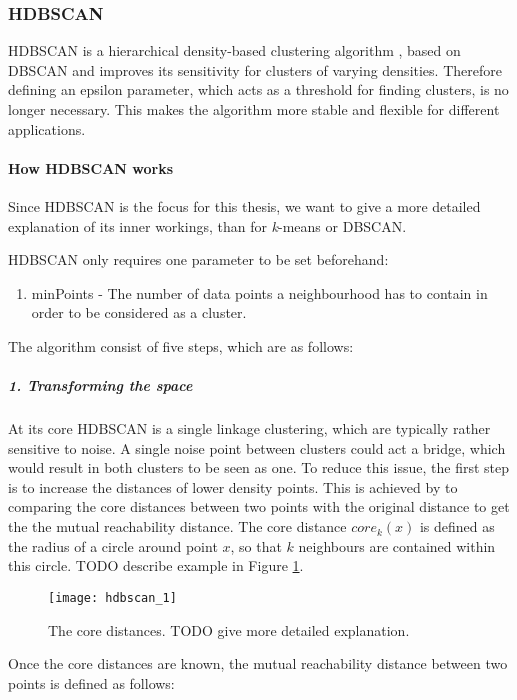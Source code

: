 \subsubsection{HDBSCAN}

HDBSCAN is a hierarchical density-based clustering algorithm \cite{McInnes2017}, based on DBSCAN and improves its sensitivity for clusters of varying densities. Therefore defining an epsilon parameter, which acts as a threshold for finding clusters, is no longer necessary. This makes the algorithm more stable and flexible for different applications. 


\paragraph{How HDBSCAN works}


Since HDBSCAN is the focus for this thesis, we want to give a more detailed explanation of its inner workings, than for \textit{k}-means or DBSCAN.

HDBSCAN only requires one parameter to be set beforehand:
\begin{enumerate}
    \item minPoints - The number of data points a neighbourhood has to contain in order to be considered as a cluster.
\end{enumerate}

The algorithm consist of five steps, which are as follows: 

\subparagraph{1. Transforming the space}

At its core HDBSCAN is a single linkage clustering, which are typically rather sensitive to noise. A single noise point between clusters could act a bridge, which would result in both clusters to be seen as one. To reduce this issue, the first step is to increase the distances of lower density points. This is achieved by to comparing the core distances between two points with the original distance to get the the mutual reachability distance. The core distance $core_k(x)$ is defined as the radius of a circle around point $x$, so that $k$ neighbours are contained within this circle. TODO describe example in Figure \ref{fig:hdbscan_1}. 

\begin{figure}[h]
    \centering
    \texttt{[image: hdbscan\_1]}
    \caption{The core distances. TODO give more detailed explanation.}
    \label{fig:hdbscan_1}
\end{figure}

Once the core distances are known, the mutual reachability distance between two points is defined as follows:

